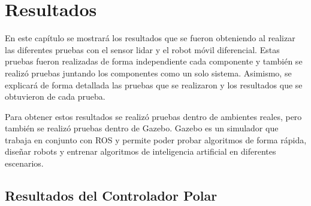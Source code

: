 \chapter{Resultados}
En este capítulo se mostrará los resultados que se fueron obteniendo al realizar las 
diferentes pruebas con el sensor lidar y el robot móvil diferencial. Estas pruebas 
fueron realizadas de forma independiente cada componente y también se realizó pruebas
juntando los componentes como un solo sistema. Asimismo, se explicará de forma detallada
las pruebas que se realizaron y los resultados que se obtuvieron de cada prueba.

Para obtener estos resultados se realizó pruebas dentro de ambientes reales, pero también 
se realizó pruebas dentro de Gazebo. Gazebo es un simulador que trabaja en conjunto con 
ROS y permite poder probar algoritmos de forma rápida, diseñar robots y entrenar algoritmos 
de inteligencia artificial en diferentes escenarios.
\section {Resultados del Controlador Polar}

